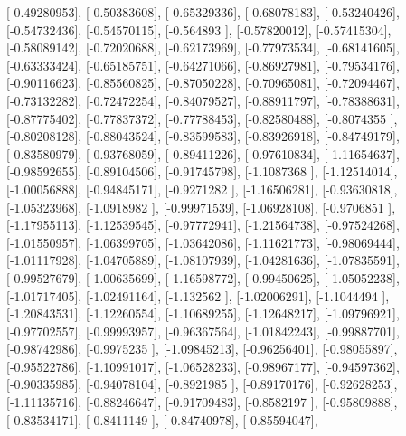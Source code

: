 \documentclass{article}
\begin{document}
       [-0.49280953],
       [-0.50383608],
       [-0.65329336],
       [-0.68078183],
       [-0.53240426],
       [-0.54732436],
       [-0.54570115],
       [-0.564893  ],
       [-0.57820012],
       [-0.57415304],
       [-0.58089142],
       [-0.72020688],
       [-0.62173969],
       [-0.77973534],
       [-0.68141605],
       [-0.63333424],
       [-0.65185751],
       [-0.64271066],
       [-0.86927981],
       [-0.79534176],
       [-0.90116623],
       [-0.85560825],
       [-0.87050228],
       [-0.70965081],
       [-0.72094467],
       [-0.73132282],
       [-0.72472254],
       [-0.84079527],
       [-0.88911797],
       [-0.78388631],
       [-0.87775402],
       [-0.77837372],
       [-0.77788453],
       [-0.82580488],
       [-0.8074355 ],
       [-0.80208128],
       [-0.88043524],
       [-0.83599583],
       [-0.83926918],
       [-0.84749179],
       [-0.83580979],
       [-0.93768059],
       [-0.89411226],
       [-0.97610834],
       [-1.11654637],
       [-0.98592655],
       [-0.89104506],
       [-0.91745798],
       [-1.1087368 ],
       [-1.12514014],
       [-1.00056888],
       [-0.94845171],
       [-0.9271282 ],
       [-1.16506281],
       [-0.93630818],
       [-1.05323968],
       [-1.0918982 ],
       [-0.99971539],
       [-1.06928108],
       [-0.9706851 ],
       [-1.17955113],
       [-1.12539545],
       [-0.97772941],
       [-1.21564738],
       [-0.97524268],
       [-1.01550957],
       [-1.06399705],
       [-1.03642086],
       [-1.11621773],
       [-0.98069444],
       [-1.01117928],
       [-1.04705889],
       [-1.08107939],
       [-1.04281636],
       [-1.07835591],
       [-0.99527679],
       [-1.00635699],
       [-1.16598772],
       [-0.99450625],
       [-1.05052238],
       [-1.01717405],
       [-1.02491164],
       [-1.132562  ],
       [-1.02006291],
       [-1.1044494 ],
       [-1.20843531],
       [-1.12260554],
       [-1.10689255],
       [-1.12648217],
       [-1.09796921],
       [-0.97702557],
       [-0.99993957],
       [-0.96367564],
       [-1.01842243],
       [-0.99887701],
       [-0.98742986],
       [-0.9975235 ],
       [-1.09845213],
       [-0.96256401],
       [-0.98055897],
       [-0.95522786],
       [-1.10991017],
       [-1.06528233],
       [-0.98967177],
       [-0.94597362],
       [-0.90335985],
       [-0.94078104],
       [-0.8921985 ],
       [-0.89170176],
       [-0.92628253],
       [-1.11135716],
       [-0.88246647],
       [-0.91709483],
       [-0.8582197 ],
       [-0.95809888],
       [-0.83534171],
       [-0.8411149 ],
       [-0.84740978],
       [-0.85594047],
\end{document}
